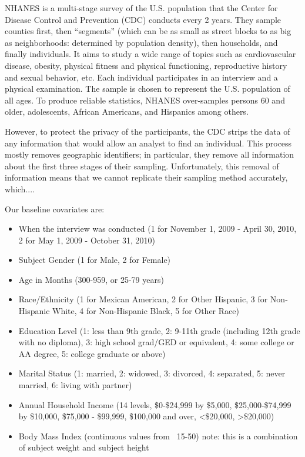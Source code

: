 \documentclass{article}
\begin{document}
NHANES is a multi-stage survey of the U.S. population that the Center for Disease Control and Prevention (CDC) conducts every 2 years.  They sample counties first, then ``segments'' (which can be as small as street blocks to as big as neighborhoods: determined by population density), then households, and finally individuals.  It aims to study a wide range of topics such as cardiovascular disease, obesity, physical fitness and physical functioning, reproductive history and sexual behavior, etc.  Each individual participates in an interview and a physical examination.  The sample is chosen to represent the U.S. population of all ages.  To produce reliable statistics, NHANES over-samples persons 60 and older, adolescents, African Americans, and Hispanics among others.  

However, to protect the privacy of the participants, the CDC strips the data of any information that would allow an analyst to find an individual.  This process mostly removes geographic identifiers; in particular, they remove all information about the first three stages of their sampling.  Unfortunately, this removal of information means that we cannot replicate their sampling method accurately, which....

Our baseline covariates are:
\begin{itemize}
\item When the interview was conducted (1 for November 1, 2009 - April 30, 2010, 2 for May 1, 2009 - October 31, 2010)
\item Subject Gender (1 for Male, 2 for Female)
\item Age in Months (300-959, or 25-79 years)
\item Race/Ethnicity (1 for Mexican American, 2 for Other Hispanic, 3 for Non-Hispanic White, 4 for Non-Hispanic Black, 5 for Other Race)
\item Education Level (1: less than 9th grade, 2: 9-11th grade (including 12th grade with no diploma), 3: high school grad/GED or equivalent, 4: some college or AA degree, 5: college graduate or above)
\item Marital Status (1: married, 2: widowed, 3: divorced, 4: separated, 5: never married, 6: living with partner)
\item Annual Household Income (14 levels, \$0-\$24,999 by \$5,000, \$25,000-\$74,999 by \$10,000,  \$75,000 - \$99,999, \$100,000 and over, <\$20,000, >\$20,000)
\item Body Mass Index (continuous values from ~15-50) note: this is a combination of subject weight and subject height
\end{itemize}
\end{document}
